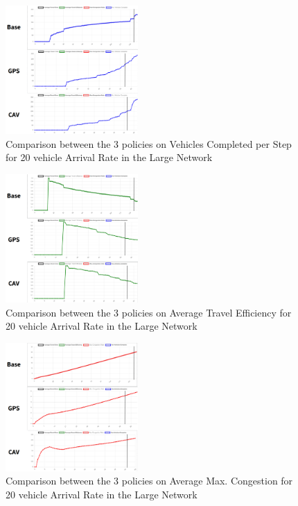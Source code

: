 \begin{figure}
    \centering
    \includegraphics[width=0.45\textwidth]{img/steps-20-large.png}
    \caption{Comparison between the 3 policies on Vehicles Completed per Step for 20 vehicle Arrival Rate in the Large Network}
    \label{fig:steps-20-large}
\end{figure}

\begin{figure}
    \centering
    \includegraphics[width=0.45\textwidth]{img/ate-20-large.png}
    \caption{Comparison between the 3 policies on Average Travel Efficiency for 20 vehicle Arrival Rate in the Large Network}
    \label{fig:ate-20-large}
\end{figure}

\begin{figure}
    \centering
    \includegraphics[width=0.45\textwidth]{img/congestion-20-large.png}
    \caption{Comparison between the 3 policies on Average Max. Congestion for 20 vehicle Arrival Rate in the Large Network}
    \label{fig:congestion-20-large}
\end{figure}

